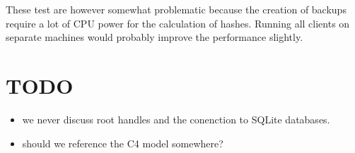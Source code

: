 These test are however somewhat problematic because the creation of backups require a lot of CPU power for the calculation of hashes. Running all clients on separate machines would probably improve the performance slightly.



\section{TODO}

\begin{itemize}
	\item we never discuss root handles and the conenction to SQLite databases.
	\item should we reference the C4 model somewhere?
\end{itemize}